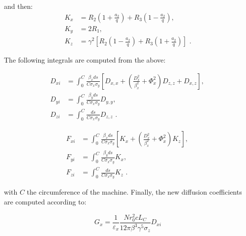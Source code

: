 and then:
\begin{equation}
    \begin{aligned}
        K_x &= R_2 \left(1 + \frac{a_2}{q}\right) + R_3 \left(1 - \frac{a_2}{q}\right) \text{,  } \\
        K_y &= 2 R_1 \text{,  }  \\
        K_z &= \gamma^2 \left[ R_2 \left(1 - \frac{a_2}{q}\right) + R_3 \left(1 + \frac{a_2}{q}\right) \right] \text{ .}
    \end{aligned}
    \label{equation:kinetic_AM_friction_terms}
\end{equation}

The following integrals are computed from the above:

\begin{equation}
    \begin{aligned}
        D_{xi} &= \int_0^C \frac{\beta_x ds}{C \sigma_x \sigma_y} \left[D_{x,x} + \left(\frac{D_x^2}{\beta_x^2} + \Phi_x^2\right) D_{z,z} + D_{x,z} \right] \text{,  } \\
        D_{yi} &= \int_0^C \frac{\beta_y ds}{C \sigma_x \sigma_y} D_{y,y} \text{,  }  \\
        D_{zi} &= \int_0^C \frac{ds}{C \sigma_x \sigma_y} D_{z,z} \text{ .}
    \end{aligned}
    \label{equation:kinetic_diffusion_integrals}
\end{equation}

\begin{equation}
    \begin{aligned}
        F_{xi} &= \int_0^C \frac{\beta_x ds}{C \sigma_x \sigma_y} \left[K_x + \left(\frac{D_x^2}{\beta_x^2} + \Phi_x^2\right) K_z \right] \text{,  } \\
        F_{yi} &= \int_0^C \frac{\beta_y ds}{C \sigma_x \sigma_y} K_x \text{,  }  \\
        F_{zi} &= \int_0^C \frac{ds}{C \sigma_x \sigma_y} K_z \text{ .}
    \end{aligned}
    \label{equation:kinetic_friction_integrals}
\end{equation}

with \(C\) the circumference of the machine.
Finally, the new diffusion coefficients are computed according to:

\begin{equation}
    \boxed{G_x = \frac{1}{\varepsilon_x} \frac{N r_0^2 c L_C}{12 \pi \beta^3 \gamma^5 \sigma_z} D_{xi}}
    \label{equation:kinetic_horizontal_diffusion_coefficient}
\end{equation}


